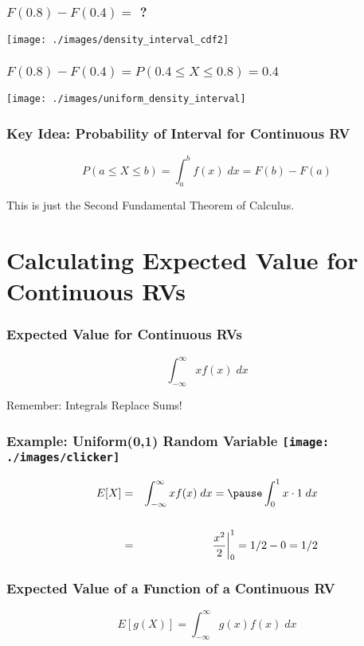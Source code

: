 \begin{frame}
\frametitle{$F(0.8) - F(0.4) = $ ?}
\centering
	\texttt{[image: ./images/density\_interval\_cdf2]}

\end{frame}


\begin{frame}
\frametitle{$F(0.8) - F(0.4) = P(0.4 \leq X \leq 0.8) = 0.4$}
\centering
	\texttt{[image: ./images/uniform\_density\_interval]}


\end{frame}
\begin{frame}
\frametitle{Key Idea: Probability of Interval for Continuous RV}

$$\boxed{P(a\leq X \leq b) = \int_a^b f(x) \; dx = F(b) - F(a)}$$

\vspace{2em}
\alert{This is just the Second Fundamental Theorem of Calculus.}
\end{frame}
\section{Calculating Expected Value for Continuous RVs}

\begin{frame}
\frametitle{Expected Value for Continuous RVs}
$$\boxed{\int_{-\infty}^\infty x f(x) \; dx  }$$

\vspace{2em}
\alert{Remember: Integrals Replace Sums!}
\end{frame}

\begin{frame}
\frametitle{Example: Uniform(0,1) Random Variable \hfill \texttt{[image: ./images/clicker]}}
\begin{eqnarray*}
	E[X] &=&  \int_{-\infty}^\infty x f(x) \; dx =\pause  \int_{0}^1 x \cdot 1 \; dx \\ \\
		&=&  \left.\frac{x^2}{2}\right|_0^1 = 1/2  - 0 = 1/2
\end{eqnarray*}
\end{frame}
\begin{frame}
\frametitle{Expected Value of a Function of a Continuous RV}
	$$\boxed{E[g(X)] = \int_{-\infty}^\infty g(x) f(x) \; dx}$$
\end{frame}


